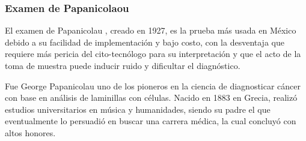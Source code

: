 \begin{table}[H]
    \centering
    \caption{Técnicas principales de diagnóstico de CCU}\label{tabla:tecnicas}
    \end{table}

\subsubsection{Examen de Papanicolaou}

El examen de Papanicolau , creado en 1927, es la
prueba más usada en México debido a su facilidad de implementación y bajo costo,
con la desventaja que requiere más pericia del cito-tecnólogo para su
interpretación y que el acto de la toma de muestra puede inducir ruido y
dificultar el diagnóstico. 

Fue George Papanicolau uno de los pioneros en la ciencia de diagnosticar cáncer
con base en análisis de laminillas con células. Nacido en 1883 en Grecia, realizó
estudios universitarios en música y humanidades, siendo su padre el que eventualmente
lo persuadió en buscar una carrera médica, la cual concluyó con altos honores.

